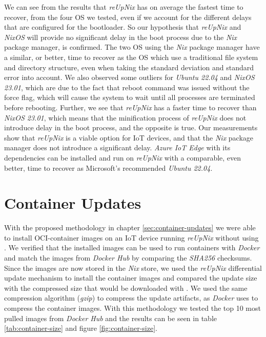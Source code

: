 \noindent
We can see from the results that \textit{reUpNix} has on average the fastest time
to recover, from the four \ac{OS} we tested, even if we account for the different
delays that are configured for the bootloader. So our hypothesis that \textit{reUpNix}
and \textit{NixOS} will provide no significant delay in the boot process due to
the \textit{Nix} package manager, is confirmed. The two \ac{OS} using the
\textit{Nix} package manager have a similar, or better, time to recover as the \ac{OS}
which use a traditional file system and directory structure, even when taking
the standard deviation and standard error into account. We also observed some outliers
for \textit{Ubuntu 22.04} and \textit{NixOS 23.01}, which are due to the
fact that reboot command was issued without the force flag, which will cause
the system to wait until all processes are terminated before rebooting. Further,
we see that \textit{reUpNix} has a faster time to recover than \textit{NixOS 23.01},
which means that the minification process of \textit{reUpNix} does not introduce
delay in the boot process, and the opposite is true.
Our measurements show that \textit{reUpNix} is a viable option for \ac{IoT} devices,
and that the \textit{Nix} package manager does not introduce a significant delay.
\textit{Azure IoT Edge} with its dependencies can be installed and run on
\textit{reUpNix} with a comparable, even better, time to recover as Microsoft's
recommended \textit{Ubuntu 22.04}.


\section{Container Updates}
With the proposed methodology in chapter \ref{sec:container-updates} we were able
to install \ac{OCI}-container images
on an \ac{IoT} device running \textit{reUpNix} without using .
We verified that the installed images can be used to run containers with \textit{Docker}
and match the images from \textit{Docker Hub} by comparing the \textit{SHA256} checksums.
Since the images are now stored in the \textit{Nix} store, we used the \textit{reUpNix}
differential update mechanism to install the container images and compared the update size
with the compressed size that would be downloaded with . We used
the same compression algorithm (\textit{gzip}) to compress the update artifacts,
as \textit{Docker} uses to compress the container images. With this methodology
we tested the top 10 most pulled images from \textit{Docker Hub} and the results
can be seen in table \ref{tab:container-size} and figure \ref{fig:container-size}.

